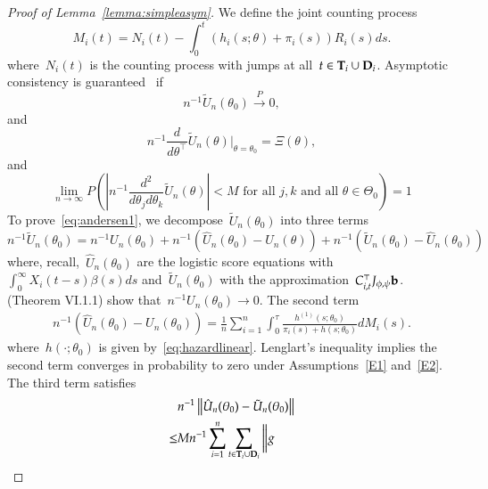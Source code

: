 \documentclass[11pt]{amsart}
\def\bfT{{\bf T}}
\def\bfD{{\bf D}}
\begin{document}
\begin{proof}[Proof of Lemma~\ref{lemma:simpleasym}]
We define the joint counting process
\[
M_i (t) = N_i (t) - \int_0^t (h_i (s; \theta) + \pi_i (s)) R_i (s) ds.
\]
where~$N_i (t)$ is the counting process with jumps at all~$t \in \bfT_i \cup \bfD_i$. Asymptotic consistency is guaranteed~\cite[Theorem VI.1.1]{Andersen1993} if
\begin{equation}
\label{eq:andersen1}
n^{-1} \tilde U_n (\theta_0 ) \overset{P}{\to} 0,
\end{equation}
and
\begin{equation}
\label{eq:andersen2}
n^{-1} \frac{d}{d \theta^{\top}} \tilde U_n (\theta) \big |_{\theta =
  \theta_0} = \Xi (\theta),
\end{equation}
and
\begin{equation}
\label{eq:andersen3}
\lim_{n \to \infty} P \left( \left | n^{-1} \frac{d^2}{d \theta_j d
      \theta_k} \tilde U_n (\theta) \right | < M \text{ for all }
  j,k \text{ and all } \theta \in \Theta_0 \right) = 1
\end{equation}
To prove~\eqref{eq:andersen1}, we decompose~$\tilde U_n (\theta_0)$ into
three terms
\[
n^{-1} \tilde U_n (\theta_0) = n^{-1} U_n (\theta_0 )  + n^{-1} \left(
  \hat U_n (\theta_0) - U_n (\theta) \right) + n^{-1} \left(\tilde U_n
  (\theta_0) - \hat U_n (\theta_0) \right)
\]
where, recall,~$\hat U_n (\theta_0)$ are the logistic score equations with $\int_0^\infty X_i(t-s) \beta(s) ds$ and~$\tilde U_n (\theta_0)$ with the approximation~$C_{i,t}^\top J_{\phi, \psi} {\bf b}$. \cite{Andersen1993} (Theorem VI.1.1) show that~$n^{-1} U_n (\theta_0)
\to 0$. The second term
\begin{align*}
n^{-1} \left( \hat U_n (\theta_0) - U_n (\theta_0) \right) =
  \frac{1}{n} \sum_{i=1}^n \int_0^{\tau} \frac{h^{(1)} (s;
  \theta_0)}{\pi_i (s) + h (s;\theta_0)} d M_i (s).
\end{align*}
where~$h(\cdot; \theta_0)$ is given by~\eqref{eq:hazardlinear}. Lenglart's inequality implies the second term converges in probability to zero under Assumptions~\ref{E1} and~\ref{E2}. The third term satisfies
\begin{align*}
  &n^{-1} \left \| \hat U_n (\theta_0) - \tilde U_n (\theta_0) \right \| \\
  \leq & M n^{-1} \sum_{i=1}^n \sum_{t \in \bfT_i \cup \bfD_i} \bigg \| g

\end{align*}
\end{proof}
\end{document}
